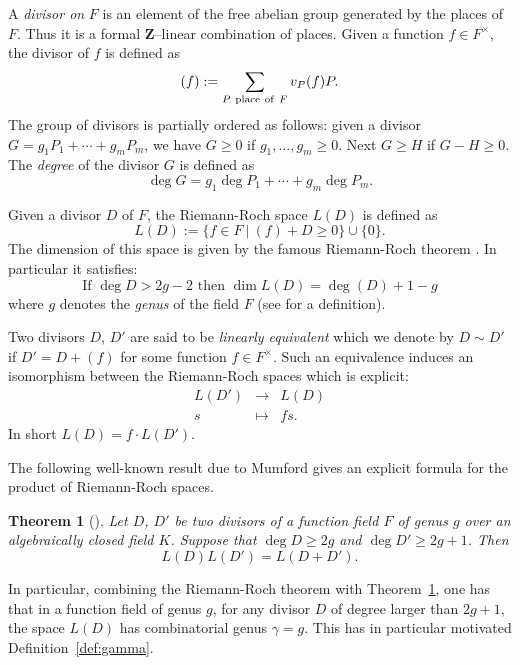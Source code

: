 \documentclass{article}
\theoremstyle{plain}
\newtheorem{thm}{Theorem}[section]
\theoremstyle{definition}
\theoremstyle{remark}
\newtheorem{rema}[thm]{Remark}
\def\Z{{\mathbf Z}}
\newcommand{\map}[4]{
  \begin{array}{ccc}
    #1 & \longrightarrow & #2 \\
    #3 & \longmapsto      & #4
  \end{array}
}
\renewcommand{\geq}{\geqslant}
\begin{document}
A {\em divisor on} $F$ is
an element of the free abelian group generated by the places of
$F$. Thus it is a formal $\Z$--linear combination of places. Given a
function $f \in F^{\times}$, the divisor of $f$ is defined as
$$
(f) := \sum_{P {\rm \ place\ of\ } F} v_P(f)P.
$$
The
group of divisors is partially ordered as follows: given a divisor
$G = g_1 P_1 + \cdots + g_m P_m$, we have $G \geq 0$ if
$g_1, \dots, g_m \geq 0$. Next $G \geq H$ if $G-H \geq 0$.
{The {\em degree} of the divisor $G$ is defined as
$$\deg G = g_1\deg P_1 + \cdots +g_m\deg P_m.$$
}

Given a divisor $D$ of $F$, the Riemann-Roch space $L(D)$ is defined as
$$
L(D) := \{ f\in F ~|~ (f) + D \geq 0\} \cup \{0\}.
$$
The dimension of this space is given by the famous Riemann-Roch
theorem \cite[Theorem 1.5.15]{Stichtenoth}. In particular it satisfies:
\begin{equation*}
\text{If } \deg D>2g-2 \text{ then }\dim L(D) = \deg(D)+1-g
\end{equation*}
where $g$ denotes the {\em genus} of the field $F$
{(see \cite[Definition 1.4.15]{Stichtenoth} for a
  definition)}.

Two divisors $D$, $D'$ are said to be {\em linearly equivalent} which
we denote by $D \sim D'$ if $D' = D+(f)$ for some function $f \in F^\times$.
Such an equivalence induces an isomorphism between the Riemann-Roch spaces
which is explicit:
$$
\map{L(D')}{L(D)}{s}{fs.}
$$
In short $L(D) = f \cdot L(D')$.

The following well-known result due to Mumford gives an explicit
formula for the product of Riemann-Roch spaces.

\begin{thm}[{\cite[Theorem~6]{Mumford}}]\label{thm:mumford}
  Let $D$, $D'$ be two divisors of a function field $F$ of genus $g$
  {over an algebraically closed field $K$}.
  Suppose that $\deg D \geq 2g$ and $\deg D' \geq 2g+1$.
  Then
  $$
  L(D)L(D') = L(D+D').
  $$
\end{thm}


In particular, combining the Riemann-Roch theorem with Theorem~\ref{thm:mumford}, one
has that in a function field of genus $g$, for any divisor $D$ of degree 
larger than $2g+1$, the space $L(D)$ has combinatorial genus
$\gamma=g$. {This has in particular motivated Definition~\ref{def:gamma}.}
\end{document}
